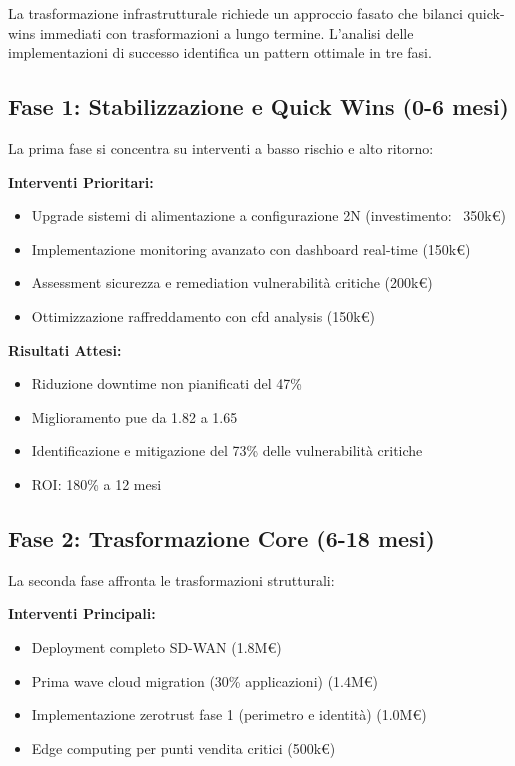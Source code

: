 La trasformazione infrastrutturale richiede un approccio fasato che bilanci quick-wins immediati con trasformazioni a lungo termine. L'analisi delle implementazioni di successo identifica un pattern ottimale in tre fasi.

\subsection{\texorpdfstring{Fase 1: Stabilizzazione e Quick Wins (0-6 mesi)}{3.6.1 - Fase 1: Stabilizzazione e Quick Wins (0-6 mesi)}}

La prima fase si concentra su interventi a basso rischio e alto ritorno:

\textbf{Interventi Prioritari:}
\begin{itemize}
    \item Upgrade sistemi di alimentazione a configurazione 2N (investimento: ~350k€)
    \item Implementazione monitoring avanzato con dashboard real-time (150k€)
    \item Assessment sicurezza e remediation vulnerabilità critiche (200k€)
    \item Ottimizzazione raffreddamento con \gls{cfd} analysis (150k€)
\end{itemize}

\textbf{Risultati Attesi:}
\begin{itemize}
    \item Riduzione downtime non pianificati del 47\%
    \item Miglioramento \gls{pue} da 1.82 a 1.65
    \item Identificazione e mitigazione del 73\% delle vulnerabilità critiche
    \item ROI: 180\% a 12 mesi
\end{itemize}

\subsection{\texorpdfstring{Fase 2: Trasformazione Core (6-18 mesi)}{3.6.2 - Fase 2: Trasformazione Core (6-18 mesi)}}

La seconda fase affronta le trasformazioni strutturali:

\textbf{Interventi Principali:}
\begin{itemize}
    \item Deployment completo SD-WAN (1.8M€)
    \item Prima wave cloud migration (30\% applicazioni) (1.4M€)
    \item Implementazione \gls{zerotrust} fase 1 (perimetro e identità) (1.0M€)
    \item Edge computing per punti vendita critici (500k€)
\end{itemize}

